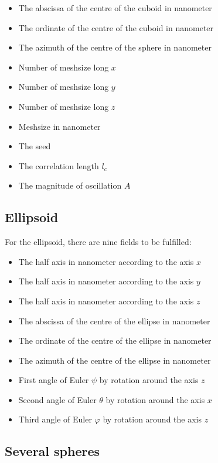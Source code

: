 \begin{itemize}
\item The abscissa of the centre of the cuboid in nanometer
\item The ordinate of the centre of the cuboid in nanometer
\item The azimuth of the centre of the sphere in nanometer
\item Number of meshsize long $x$
\item Number of meshsize long $y$
\item Number of meshsize long $z$
\item Meshsize in nanometer
\item The seed
\item The correlation length $l_c$
\item The magnitude of oscillation $A$

\end{itemize}


\subsection{Ellipsoid}

For the ellipsoid, there are nine fields to be fulfilled:

\begin{itemize}
\item The half axis in nanometer according to the axis $x$
\item The half axis in nanometer according to the axis $y$
\item The half axis in nanometer according to the axis $z$
\item The abscissa of the centre of the ellipse in nanometer
\item The ordinate of the centre of the ellipse in nanometer
\item The azimuth of the centre of the ellipse in nanometer
\item First angle of Euler $\psi$ by rotation around the axis $z$
\item Second angle of Euler $\theta$ by rotation around the axis $x$
\item Third angle of Euler $\varphi$ by rotation around the axis $z$
\end{itemize}


\subsection{Several spheres}

